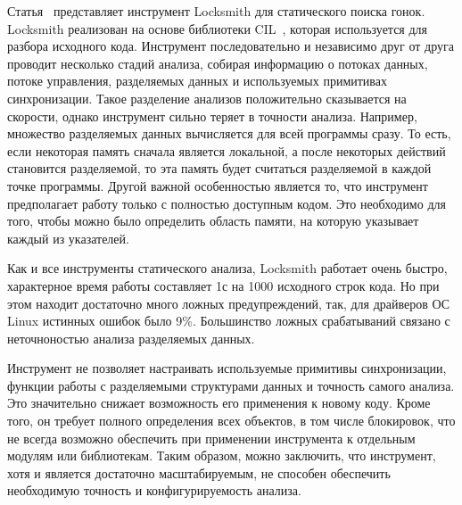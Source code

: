 Статья~\cite{Pratikakis:2011} представляет инструмент Locksmith для статического поиска гонок.
Locksmith реализован на основе библиотеки CIL~\cite{CIL}, которая используется для разбора исходного кода.
Инструмент последовательно и независимо друг от друга проводит несколько стадий анализа, собирая информацию о потоках данных, потоке управления, разделяемых данных и используемых примитивах синхронизации.
Такое разделение анализов положительно сказывается на скорости, однако инструмент сильно теряет в точности анализа.
Например, множество разделяемых данных вычисляется для всей программы сразу. 
То есть, если некоторая память сначала является локальной, а после некоторых действий становится разделяемой, то эта память будет считаться разделяемой в каждой точке программы.
Другой важной особенностью является то, что инструмент предполагает работу только с полностью доступным кодом.
Это необходимо для того, чтобы можно было определить область памяти, на которую указывает каждый из указателей.

Как и все инструменты статического анализа, Locksmith работает очень быстро, характерное время работы составляет 1с на 1000 исходного строк кода.
Но при этом находит достаточно много ложных предупреждений, так, для драйверов ОС Linux истинных ошибок было 9\%.
Большинство ложных срабатываний связано с неточноностью анализа разделяемых данных.

Инструмент не позволяет настраивать используемые примитивы синхронизации, функции работы с разделяемыми структурами данных и точность самого анализа. 
Это значительно снижает возможность его применения к новому коду.
Кроме того, он требует полного определения всех объектов, в том числе блокировок, что не всегда возможно обеспечить при применении инструмента к отдельным модулям или библиотекам.
Таким образом, можно заключить, что инструмент, хотя и является достаточно масштабируемым, не способен обеспечить необходимую точность и конфигурируемость анализа.

